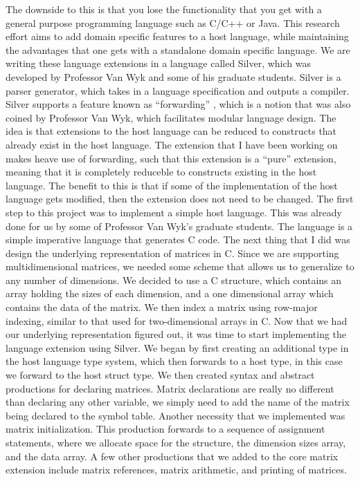 \documentclass[a4paper,12pt]{article}
\newcommand{\tab}{\hspace*{2em}}
\begin{document}
 The downside to this is that you lose the functionality that you get with a general purpose programming language such as C/C++ or Java.  This research effort aims to add domain specific features to a host language, while maintaining the advantages that one gets with a standalone domain specific language. \newline
\tab We are writing these language extensions in a language called Silver, which was developed by Professor Van Wyk and some of his graduate students.  Silver is a parser generator, which takes in a language specification and outputs a compiler.  Silver supports a feature known as ``forwarding'' , which is a notion that was also coined by Professor Van Wyk, which facilitates modular language design.  The idea is that extensions to the host language can be reduced to constructs that already exist in the host language.  The extension that I have been working on makes heave use of forwarding, such that this extension is a ``pure'' extension, meaning that it is completely reduceble to constructs existing in the host language.  The benefit to this is that if some of the implementation of the host language gets modified, then the extension does not need to be changed.  \newline
\tab The first step to this project was to implement a simple host language.  This was already done for us by some of Professor Van Wyk's graduate students.  The language is a simple imperative language that generates C code.  The next thing that I did was design the underlying representation of matrices in C.  Since we are supporting multidimensional matrices, we needed some scheme that allows us to generalize to any number of dimensions.  We decided to use a C structure, which contains an array holding the sizes of each dimension, and a one dimensional array which contains the data of the matrix.  We then index a matrix using row-major indexing, similar to that used for two-dimensional arrays in C.  Now that we had our underlying representation figured out, it was time to start implementing the language extension using Silver.  \newline
\tab We began by first creating an additional type in the host language type system, which then forwards to a host type, in this case we forward to the host struct type.  We then created syntax and abstract productions for declaring matrices.  Matrix declarations are really no different than declaring any other variable, we simply need to add the name of the matrix being declared to the symbol table.  Another necessity that we implemented was matrix initialization.  This production forwards to a sequence of assignment statements, where we allocate space for the structure, the dimension sizes array, and the data array.  A few other productions that we added to the core matrix extension include matrix references, matrix arithmetic, and printing of matrices.  \newline
\end{document}
